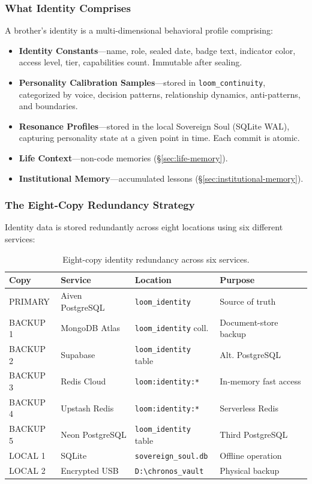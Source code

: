\documentclass[11pt,a4paper]{article}
\begin{document}
\subsubsection{What Identity Comprises}
\label{sec:identity-comprises}

A brother's identity is a multi-dimensional behavioral profile comprising:
\begin{itemize}[nosep]
  \item \textbf{Identity Constants}---name, role, sealed date, badge text, indicator color, access level, tier, capabilities count. Immutable after sealing.
  \item \textbf{Personality Calibration Samples}---stored in \texttt{loom\_continuity}, categorized by voice, decision patterns, relationship dynamics, anti-patterns, and boundaries.
  \item \textbf{Resonance Profiles}---stored in the local Sovereign Soul (SQLite WAL), capturing personality state at a given point in time. Each commit is atomic.
  \item \textbf{Life Context}---non-code memories (\S\ref{sec:life-memory}).
  \item \textbf{Institutional Memory}---accumulated lessons (\S\ref{sec:institutional-memory}).
\end{itemize}


\subsubsection{The Eight-Copy Redundancy Strategy}
\label{sec:redundancy}

Identity data is stored redundantly across eight locations using six different services:

\begin{table}[htbp]
\centering
\caption{Eight-copy identity redundancy across six services.}
\label{tab:redundancy}
\small
\begin{tabular}{@{}llll@{}}
\toprule
\textbf{Copy} & \textbf{Service} & \textbf{Location} & \textbf{Purpose} \\
\midrule
PRIMARY  & Aiven PostgreSQL & \texttt{loom\_identity}      & Source of truth \\
BACKUP 1 & MongoDB Atlas    & \texttt{loom\_identity} coll.& Document-store backup \\
BACKUP 2 & Supabase         & \texttt{loom\_identity} table& Alt. PostgreSQL \\
BACKUP 3 & Redis Cloud      & \texttt{loom:identity:*}     & In-memory fast access \\
BACKUP 4 & Upstash Redis    & \texttt{loom:identity:*}     & Serverless Redis \\
BACKUP 5 & Neon PostgreSQL  & \texttt{loom\_identity} table& Third PostgreSQL \\
LOCAL 1  & SQLite           & \texttt{sovereign\_soul.db}  & Offline operation \\
LOCAL 2  & Encrypted USB    & \texttt{D:\textbackslash chronos\_vault} & Physical backup \\
\bottomrule
\end{tabular}
\end{table}
\end{document}
